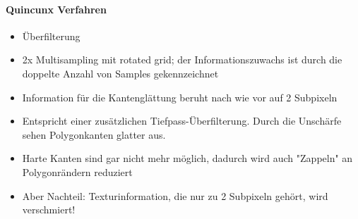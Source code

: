 \documentclass[10pt,landscape]{article}
\begin{document}
\begin{multicols}{3}
\paragraph{Quincunx Verfahren}
\begin{itemize}
  \item Überfilterung
  \item 2x Multisampling mit rotated grid; der Informationszuwachs ist durch die doppelte Anzahl von Samples gekennzeichnet
  \item Information für die Kantenglättung beruht nach wie vor auf 2 Subpixeln
  \item Entspricht einer zusätzlichen Tiefpass-Überfilterung. Durch die Unschärfe sehen Polygonkanten glatter aus.
  \item Harte Kanten sind gar nicht mehr möglich, dadurch wird auch "Zappeln" an Polygonrändern reduziert
  \item Aber Nachteil: Texturinformation, die nur zu 2 Subpixeln gehört, wird verschmiert!
\end{itemize}


\end{multicols}
\end{document}
